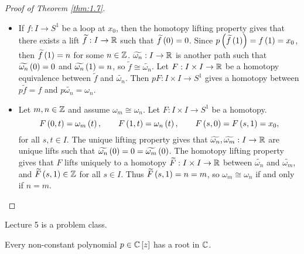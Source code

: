 \begin{proof}[Proof of Theorem \ref{thm:1.7}]
\hfill
\begin{itemize}
\item If $ f : I \to S^1 $ be a loop at $ x_0 $, then the homotopy lifting property gives that there exists a lift $ \widetilde{f} : I \to \mathbb{R} $ such that $ \widetilde{f}\left( 0 \right) = 0 $. Since $ p\left( \widetilde{f}\left( 1 \right) \right) = f\left( 1 \right) = x_0 $, then $ \widetilde{f}\left( 1 \right) = n $ for some $ n \in \mathbb{Z} $. $ \widetilde{\omega_n} : I \to \mathbb{R} $ is another path such that $ \widetilde{\omega_n}\left( 0 \right) = 0 $ and $ \widetilde{\omega_n}\left( 1 \right) = n $, so $ \widetilde{f} \cong \widetilde{\omega_n} $. Let $ F : I \times I \to \mathbb{R} $ be a homotopy equivalence between $ \widetilde{f} $ and $ \widetilde{\omega_n} $. Then $ pF : I \times I \to S^1 $ gives a homotopy between $ p\widetilde{f} = f $ and $ p\widetilde{\omega_n} = \omega_n $.
\item Let $ m, n \in \mathbb{Z} $ and assume $ \omega_m \cong \omega_n $. Let $ F : I \times I \to S^1 $ be a homotopy.
$$ F\left( 0, t \right) = \omega_m\left( t \right), \qquad F\left( 1, t \right) = \omega_n\left( t \right), \qquad F\left( s, 0 \right) = F\left( s, 1 \right) = x_0, $$
for all $ s, t \in I $. The unique lifting property gives that $ \widetilde{\omega_n}, \widetilde{\omega_m} : I \to \mathbb{R} $ are unique lifts such that $ \widetilde{\omega_n}\left( 0 \right) = 0 = \widetilde{\omega_m}\left( 0 \right) $. The homotopy lifting property gives that $ F $ lifts uniquely to a homotopy $ \widetilde{F} : I \times I \to \mathbb{R} $ between $ \widetilde{\omega_n} $ and $ \widetilde{\omega_m} $, and $ \widetilde{F}\left( s, 1 \right) \in \mathbb{Z} $ for all $ s \in I $. Thus $ \widetilde{F}\left( s, 1 \right) = n = m $, so $ \omega_m \cong \omega_n $ if and only if $ n = m $.
\end{itemize}
\end{proof}


Lecture 5 is a problem class.


\begin{theorem}
Every non-constant polynomial $ p \in \mathbb{C}\left[ z \right] $ has a root in $ \mathbb{C} $.
\end{theorem}

